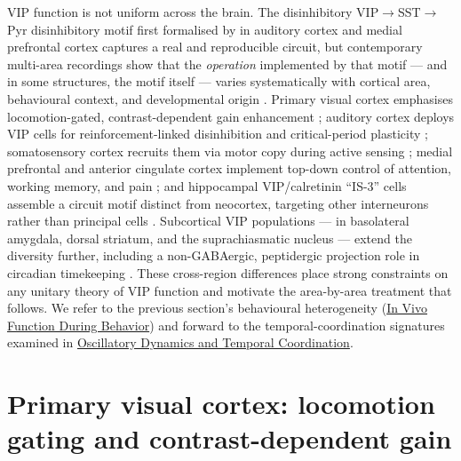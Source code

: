 \documentclass[11pt]{article}
\let\origrightarrow\rightarrow
\def\rightarrow{\ensuremath{\origrightarrow}}
\begin{document}
VIP function is not uniform across the brain. The disinhibitory VIP\rightarrow SST\rightarrow Pyr disinhibitory motif first formalised by \citep{Pi2013} in auditory cortex and medial prefrontal cortex captures a real and reproducible circuit, but contemporary multi-area recordings show that the \textit{operation} implemented by that motif --- and in some structures, the motif itself --- varies systematically with cortical area, behavioural context, and developmental origin \citep{Pi2013, Karnani2016b, Dipoppa2018, Lee2013, Bastos2023a}. Primary visual cortex emphasises locomotion-gated, contrast-dependent gain enhancement \citep{Dipoppa2018, Millman2020, Pakan2016}; auditory cortex deploys VIP cells for reinforcement-linked disinhibition and critical-period plasticity \citep{Pi2013}; somatosensory cortex recruits them via motor copy during active sensing \citep{Lee2013, Sermet2019}; medial prefrontal and anterior cingulate cortex implement top-down control of attention, working memory, and pain \citep{Bastos2023a, Anastasiades2021a, Kamigaki2017, Li2022a}; and hippocampal VIP/calretinin ``IS-3'' cells assemble a circuit motif distinct from neocortex, targeting other interneurons rather than principal cells \citep{Gulyas1996, Tyan2014, Tricoire2011}. Subcortical VIP populations --- in basolateral amygdala, dorsal striatum, and the suprachiasmatic nucleus --- extend the diversity further, including a non-GABAergic, peptidergic projection role in circadian timekeeping \citep{Rhomberg2018, Vereczki2021, Munozmanchado2018, Maywood2006, Cutler2003}. These cross-region differences place strong constraints on any unitary theory of VIP function and motivate the area-by-area treatment that follows. We refer to the previous section's behavioural heterogeneity (\href{/in-vivo-behavior}{In Vivo Function During Behavior}) and forward to the temporal-coordination signatures examined in \href{/oscillatory-dynamics}{Oscillatory Dynamics and Temporal Coordination}.

\section{Primary visual cortex: locomotion gating and contrast-dependent gain}
\end{document}
